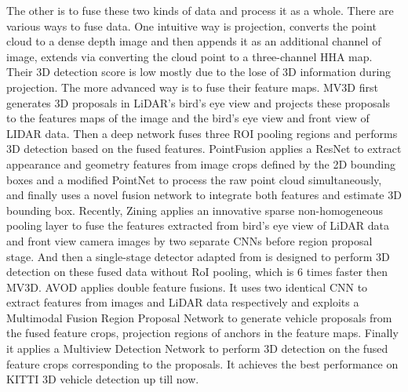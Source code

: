 The other is to fuse these two kinds of data and process it as a whole. There are various ways to fuse data. One intuitive way is projection, \eg \cite{DBLP:journals/corr/EitelSSRB15} converts the point cloud to a dense depth image and then appends it as an additional channel of image, \cite{7487370} extends \cite{DBLP:journals/corr/EitelSSRB15} via converting the cloud point to a three-channel HHA map. Their 3D detection score is low mostly due to the lose of 3D information during projection. The more advanced way is to fuse their feature maps. MV3D \cite{DBLP:journals/corr/ChenMWLX16} first generates 3D proposals in LiDAR's bird's eye view and projects these proposals to the features maps of the image and the bird’s eye view and front view of LIDAR data. Then a deep network fuses three ROI pooling regions and performs 3D detection based on the fused features. PointFusion\cite{DBLP:journals/corr/abs-1711-10871} applies a ResNet \cite{DBLP:journals/corr/HeZRS15} to extract appearance and geometry features from image crops defined by the 2D bounding boxes and a modified PointNet \cite{DBLP:journals/corr/QiSMG16} to process the raw point cloud simultaneously, and finally uses a novel fusion network to integrate both features and estimate 3D bounding box. Recently, Zining \etal \cite{DBLP:journals/corr/abs-1711-06703} applies an innovative sparse non-homogeneous pooling layer to fuse the features extracted from bird’s eye view of LiDAR data and front view camera images by two separate CNNs before region proposal stage. And then a single-stage detector adapted from \cite{DBLP:journals/corr/abs-1708-02002} is designed to perform 3D detection on these fused data without RoI pooling, which is 6 times faster then MV3D. AVOD \cite{DBLP:journals/corr/abs-1712-02294} applies double feature fusions.  It uses two identical CNN to extract features from images and LiDAR data respectively and exploits a Multimodal Fusion Region Proposal Network to generate vehicle proposals from the fused feature crops, projection regions of anchors in the feature maps. Finally it applies a Multiview Detection Network to perform 3D detection on the fused feature crops corresponding to the proposals. It achieves the best performance on KITTI 3D vehicle detection up till now.




